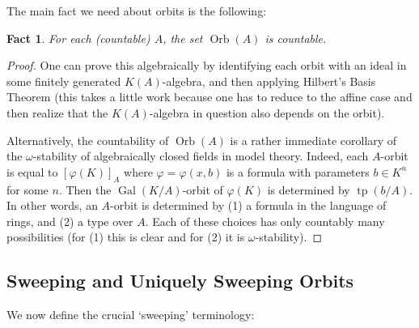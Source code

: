 \documentclass{amsart}
\newtheorem{fact}[theorem]{Fact}
\theoremstyle{definition}
\newtheorem{definition}[theorem]{Definition}
\newcommand{\tp}{\operatorname{tp}}
\begin{document}

The main fact we need about orbits is the following:

\begin{fact}\label{F: omega stable} For each (countable) $A$, the set $\operatorname{Orb}(A)$ is countable.
\end{fact}
\begin{proof} One can prove this algebraically by identifying each orbit with an ideal in some finitely generated $K(A)$-algebra, and then applying Hilbert's Basis Theorem (this takes a little work because one has to reduce to the affine case and then realize that the $K(A)$-algebra in question also depends on the orbit).

Alternatively, the countability of $\operatorname{Orb}(A)$ is a rather immediate corollary of the $\omega$-stability of algebraically closed fields in model theory. Indeed, each $A$-orbit is equal to $[\varphi(K)]_A$ where $\varphi=\varphi(x,b)$ is a formula with parameters $b\in K^n$ for some $n$. Then the $\operatorname{Gal}(K/A)$-orbit of $\varphi(K)$ is determined by $\tp(b/A)$. In other words, an $A$-orbit is determined by (1) a formula in the language of rings, and (2) a type over $A$. Each of these choices has only countably many possibilities (for (1) this is clear and for (2) it is $\omega$-stability). 
\end{proof}

\subsection{Sweeping and Uniquely Sweeping Orbits}

We now define the crucial `sweeping' terminology:
\end{document}
